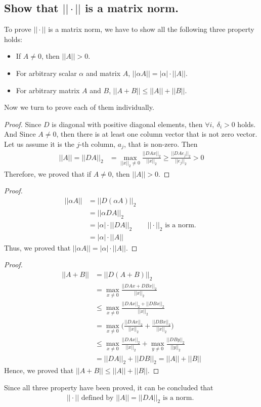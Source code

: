 \documentclass[11pt,a4paper]{article}
\begin{document}
\newpage
\subsection{Show that $|| \cdot ||$ is a matrix norm.}
To prove $||\cdot||$ is a matrix norm, we have to show all the following three
property holds: 
\begin{itemize}
    \item If $A \not = 0$, then $|| A || > 0$.
    \item For arbitrary scalar $\alpha$ and matrix $A$, $||\alpha A|| = | \alpha | \cdot || A || $.
    \item For arbitrary matrix $A$ and $B$, $|| A+B || \leq || A || + || B ||$.
\end{itemize}
Now we turn to prove each of them individually.
\begin{proof}
    Since $D$ is diagonal with positive diagonal elements, then $\forall i,\
    \delta_i > 0$ holds. And Since $A \not = 0$, then there is at least one
    column vector that is not zero vector. Let us assume it is the $j$-th
    column, $a_j$, that is non-zero. Then
    \begin{align}
        || A || = || DA ||_2 
        &= \max_{||x||_2 \not=0} \frac{||DAx||_2}{||x||_2}
        \geq \frac{||DAe_j||_2}{|| e_j ||_2} > 0
    \end{align}
    Therefore, we proved that if $A \not = 0$, then $|| A || > 0$.
\end{proof}
\begin{proof}
    \begin{align}
        || \alpha A ||  
        &= || D (\alpha A) ||_2 \\
        &= ||\alpha  D A ||_2 \\
        &= |\alpha| \cdot || D A ||_2 && ||\cdot||_2 \text{ is a norm. } \\
        &= |\alpha| \cdot || A ||
    \end{align}
    Thus, we proved that $|| \alpha A || = |\alpha| \cdot || A ||$.
\end{proof}
\begin{proof}
    \begin{align}     
        || A + B || &= || D (A + B) ||_2  \\
        &= \max_{x\not=0} \frac{||DAx+DBx||_2}{||x||_2} \\
        &\leq \max_{x\not=0} \frac{||DAx||_2+||DBx||_2}{||x||_2} \\
        &= \max_{x\not=0} \bigg(\frac{||DAx||_2}{||x||_2} +
        \frac{||DBx||_2}{||x||_2} \bigg) \\
        &\leq \max_{x\not=0} \frac{||DAx||_2}{||x||_2} +
        \max_{y\not=0} \frac{||DBy||_2}{||y||_2}  \\
        &= || DA ||_2 + || DB ||_2 = || A || + || B ||
    \end{align}
    Hence, we proved that $|| A + B || \leq || A || + || B ||$.
\end{proof}
Since all three property have been proved, it can be concluded that 
\begin{align}
    || \cdot || \text{ defined by $|| A || = || DA ||_2 $ is a norm. }
\end{align}
\end{document}
